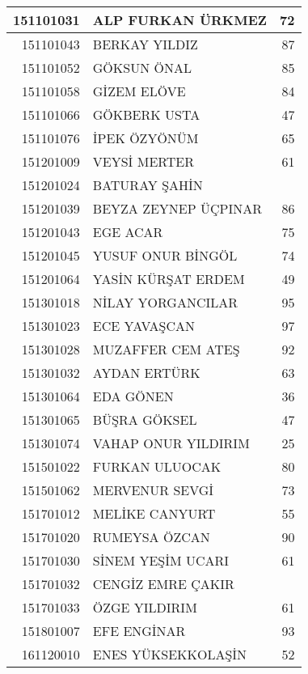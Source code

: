 \documentclass[12pt]{article}
\begin{document}
\begin{longtable}{||r||l||r||}
    \midrule
    151101031 & ALP FURKAN ÜRKMEZ & \cellcolor[rgb]{ 1,  1,  0} 72 \\
    \midrule
    151101043 & BERKAY YILDIZ & 87 \\
    \midrule
    151101052 & GÖKSUN ÖNAL & 85 \\
    \midrule
    151101058 & GİZEM ELÖVE & 84 \\
    \midrule
    151101066 & GÖKBERK USTA & 47 \\
    \midrule
    151101076 & İPEK ÖZYÖNÜM & 65 \\
    \midrule
    151201009 & VEYSİ MERTER & 61 \\
    \midrule
    151201024 & BATURAY ŞAHİN &  \\
    \midrule
    151201039 & BEYZA ZEYNEP ÜÇPINAR & 86 \\
    \midrule
    151201043 & EGE ACAR & 75 \\
    \midrule
    151201045 & YUSUF ONUR BİNGÖL & 74 \\
    \midrule
    151201064 & YASİN KÜRŞAT ERDEM & 49 \\
    \midrule
    151301018 & NİLAY YORGANCILAR & 95 \\
    \midrule
    151301023 & ECE YAVAŞCAN & 97 \\
    \midrule
    151301028 & MUZAFFER CEM ATEŞ & 92 \\
    \midrule
    151301032 & AYDAN ERTÜRK & 63 \\
    \midrule
    151301064 & EDA GÖNEN & 36 \\
    \midrule
    151301065 & BÜŞRA GÖKSEL & \cellcolor[rgb]{ 1,  1,  0} 47 \\
    \midrule
    151301074 & VAHAP ONUR YILDIRIM & 25 \\
    \midrule
    151501022 & FURKAN ULUOCAK & 80 \\
    \midrule
    151501062 & MERVENUR SEVGİ & 73 \\
    \midrule
    151701012 & MELİKE CANYURT & 55 \\
    \midrule
    151701020 & RUMEYSA ÖZCAN & 90 \\
    \midrule
    151701030 & SİNEM YEŞİM UCARI & 61 \\
    \midrule
    151701032 & CENGİZ EMRE ÇAKIR &  \\
    \midrule
    151701033 & ÖZGE YILDIRIM & 61 \\
    \midrule
    151801007 & EFE ENGİNAR & 93 \\
    \midrule
    161120010 & ENES YÜKSEKKOLAŞİN & 52 \\

\end{longtable}
\end{document}
